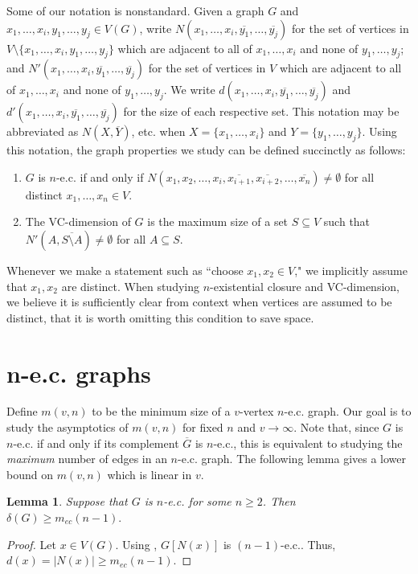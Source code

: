 \documentclass{article}
\newcommand\sm{\setminus}
\newtheorem{lemma}[thm]{Lemma}
\theoremstyle{definition}
\begin{document}
Some of our notation is nonstandard. Given a graph $G$ and $x_1,\ldots, x_i,y_1,\ldots,y_j\in V(G)$, write $N(x_1,\ldots, x_i,\overline{y_1},\ldots,\overline{y_j})$ for the set of vertices in $V\sm \{x_1,\ldots,x_i,y_1,\ldots,y_j\}$ which are adjacent to all of $x_1,\ldots, x_i$ and none of $y_1,\ldots, y_j$; and $N'(x_1,\ldots,x_i,\overline{y_1},\ldots,\overline{y_j})$ for the set of vertices in $V$ which are adjacent to all of $x_1,\ldots,x_i$ and none of $y_1,\ldots,y_j$. We write $d(x_1,\ldots,x_i,\overline{y_1},\ldots,\overline{y_j})$ and $d'(x_1,\ldots,x_i,\overline{y_1},\ldots,\overline{y_j})$ for the size of each respective set. This notation may be abbreviated as $N(X,\overline Y)$, etc. when $X=\{x_1,\ldots,x_i\}$ and $Y=\{y_1,\ldots,y_j\}$. Using this notation, the graph properties we study can be defined succinctly as follows:
\begin{enumerate}
    \item $G$ is $n$-e.c. if and only if $N(x_1,x_2,\ldots,x_i,\overline{x_{i+1}},\overline{x_{i+2}},\ldots,\overline{x_n})\ne\emptyset$ for all distinct $x_1,\ldots,x_n\in V$.
    \item The VC-dimension of $G$ is the maximum size of a set $S\subseteq V$ such that $N'(A,\overline{S\sm A})\ne\emptyset$ for all $A\subseteq S$.
\end{enumerate}

Whenever we make a statement such as ``choose $x_1,x_2\in V$," we implicitly assume that $x_1,x_2$ are distinct. When studying $n$-existential closure and VC-dimension, we believe it is sufficiently clear from context when vertices are assumed to be distinct, that it is worth omitting this condition to save space.

\section{n-e.c. graphs}

Define $m(v,n)$ to be the minimum size of a $v$-vertex $n$-e.c. graph. Our goal is to study the asymptotics of $m(v,n)$ for fixed $n$ and $v\to\infty$. Note that, since $G$ is $n$-e.c. if and only if its complement $\overline{G}$ is $n$-e.c., this is equivalent to studying the \textit{maximum} number of edges in an $n$-e.c. graph. The following lemma gives a lower bound on $m(v,n)$ which is linear in $v$.

\begin{lemma} \label{Lemma minimum degree}
    Suppose that $G$ is $n$-e.c. for some $n\ge 2$. Then $\delta(G)\ge m_{ec}(n-1).$
\end{lemma}
\begin{proof}
    Let $x\in V(G)$. Using \cite{bonato2009search}, $G[N(x)]$ is $(n-1)$-e.c.. Thus, $d(x)=|N(x)|\ge m_{ec}(n-1)$.
\end{proof}
\end{document}
